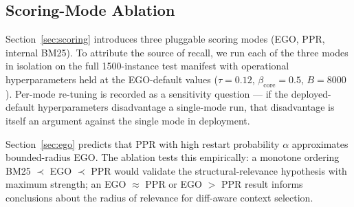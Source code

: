 \documentclass[11pt, a4paper]{article}
\begin{document}
\subsection{Scoring-Mode Ablation}
\label{sec:prelim-ablation}

Section~\ref{sec:scoring} introduces three pluggable scoring modes (EGO, PPR, internal BM25). To attribute the source of recall, we run each of the three modes in isolation on the full 1500-instance test manifest with operational hyperparameters held at the EGO-default values ($\tau{=}0.12$, $\beta_{\mathrm{core}}{=}0.5$, $B{=}8000$). Per-mode re-tuning is recorded as a sensitivity question --- if the deployed-default hyperparameters disadvantage a single-mode run, that disadvantage is itself an argument against the single mode in deployment.

Section~\ref{sec:ego} predicts that PPR with high restart probability $\alpha$ approximates bounded-radius EGO. The ablation tests this empirically: a monotone ordering BM25 $\prec$ EGO $\prec$ PPR would validate the structural-relevance hypothesis with maximum strength; an EGO $\approx$ PPR or EGO $>$ PPR result informs conclusions about the radius of relevance for diff-aware context selection.

\begin{table}[h]
\centering
\small
\caption{Scoring-mode ablation at $B{=}8000$, deployed-default operational hyperparameters. File recall with 95\% percentile bootstrap CIs over $n{=}500$ instances per test set, intent-to-treat. The first two columns are graph-based scoring instantiations of $\hat{w}(f, \Delta)$ inside the diffctx pipeline; EGO is the deployed default. The third column reproduces the external whole-file BM25 baseline of Table~\ref{tab:prelim-baselines} as a reference point at the same budget; an internal-BM25 instantiation (BM25 fragments inside the framework's selection machinery, distinct from whole-file packing) is implemented in \texttt{src/scoring.rs::BM25Scoring} but was not run as a separate sweep cell in this version and is left as future work.}
\label{tab:prelim-ablation}
\end{table}
\end{document}
